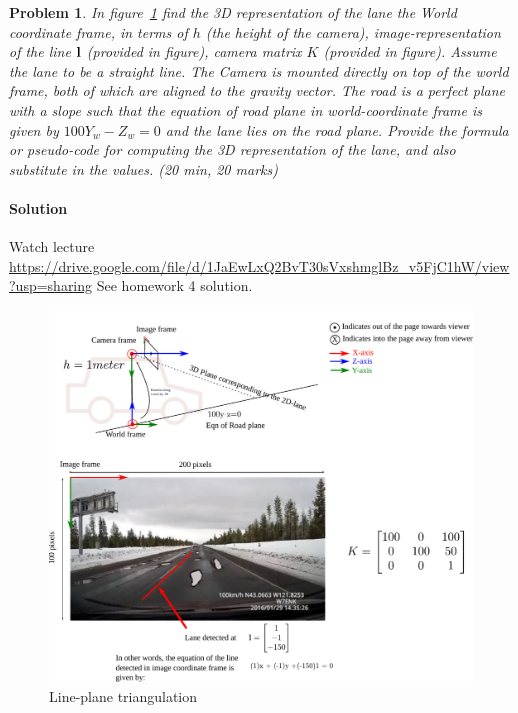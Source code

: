 \documentclass{article}
\newtheorem{prob}{Problem}
\begin{document}
\begin{prob}
  In figure~\ref{fig:line-plane-triangulation} find the 3D representation of the
  lane the World coordinate frame, in terms of $h$ (the height of the camera),
  image-representation of the line $\mathbf{l}$ (provided in figure), camera matrix
  $K$ (provided in figure). Assume the lane to be a straight line.
  The Camera is mounted directly on top of the
  world frame, both of which are aligned to the gravity vector.
  The road is a perfect plane with a slope such that the equation of road plane
  in world-coordinate frame is given by $100 Y_w - Z_w = 0$ and the lane lies
  on the road plane. Provide the formula or pseudo-code for computing the
  3D representation of the lane, and also substitute in the values. (20 min, 20 marks)
\end{prob}

\paragraph*{Solution}

Watch lecture \url{https://drive.google.com/file/d/1JaEwLxQ2BvT30sVxshmglBz_v5FjC1hW/view?usp=sharing}
See homework 4 solution.

\begin{figure}
  \includegraphics[width=\linewidth]{media/image-road-triangulation-line-plane.pdf}
  \caption{Line-plane triangulation}
  \label{fig:line-plane-triangulation}
\end{figure}
\end{document}
